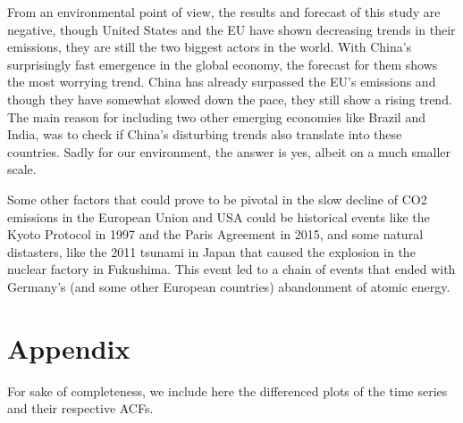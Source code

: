 \documentclass[
]{article}
\begin{document}
From an environmental point of view, the results and forecast of this
study are negative, though United States and the EU have shown
decreasing trends in their emissions, they are still the two biggest
actors in the world. With China's surprisingly fast emergence in the
global economy, the forecast for them shows the most worrying trend.
China has already surpassed the EU's emissions and though they have
somewhat slowed down the pace, they still show a rising trend. The main
reason for including two other emerging economies like Brazil and India,
was to check if China's disturbing trends also translate into these
countries. Sadly for our environment, the answer is yes, albeit on a
much smaller scale.

Some other factors that could prove to be pivotal in the slow decline of
CO2 emissions in the European Union and USA could be historical events
like the Kyoto Protocol in 1997 and the Paris Agreement in 2015, and
some natural distasters, like the 2011 tsunami in Japan that caused the
explosion in the nuclear factory in Fukushima. This event led to a chain
of events that ended with Germany's (and some other European countries)
abandonment of atomic energy.

\newpage

\hypertarget{appendix}{%
\section{Appendix}\label{appendix}}

For sake of completeness, we include here the differenced plots of the
time series and their respective ACFs.
\end{document}
